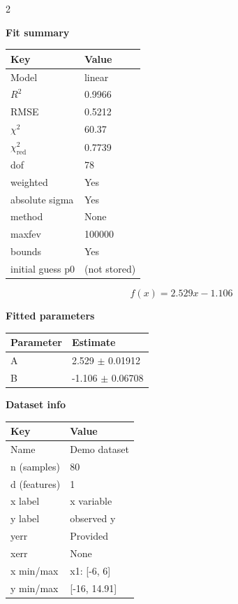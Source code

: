 \documentclass[10pt]{article}
\begin{document}
\begin{multicols}{2}

\textbf{Fit summary}\\[-2pt]
\begin{tabularx}{\linewidth}{@{}lX@{}}
\toprule
Key & Value \\
\midrule
Model & linear \\
$R^2$ & 0.9966 \\
RMSE & 0.5212 \\
$\chi^2$ & 60.37 \\
$\chi^2_{\mathrm{red}}$ & 0.7739 \\
dof & 78 \\
weighted & Yes \\
absolute sigma & Yes \\
method & None \\
maxfev & 100000 \\
bounds & Yes \\
initial guess p0 & (not stored) \\
\bottomrule
\end{tabularx}

\vspace{15pt}

\[
f(x) = 2.529 x - 1.106
\]

\columnbreak

\textbf{Fitted parameters}\\[-2pt]
\begin{tabularx}{\linewidth}{@{}lX@{}}
\toprule
Parameter & Estimate \\
\midrule
A & 2.529 $\pm$ 0.01912 \\
B & -1.106 $\pm$ 0.06708 \\
\bottomrule
\end{tabularx}

\vspace{8pt}

\textbf{Dataset info}\\[-0pt]
\vspace{2pt}
\begin{tabularx}{\linewidth}{@{}lX@{}}
\toprule
Key & Value \\
\midrule
Name & Demo dataset \\
n (samples) & 80 \\
d (features) & 1 \\
x label & x variable \\
y label & observed y \\
yerr & Provided \\
xerr & None \\
x min/max & x1: [-6, 6] \\
y min/max & [-16, 14.91] \\
\bottomrule
\end{tabularx}

\end{multicols}
\end{document}
